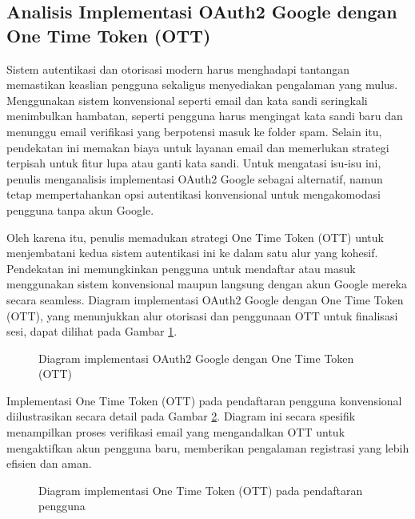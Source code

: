 \subsection{Analisis Implementasi OAuth2 Google dengan One Time Token (OTT)}

Sistem autentikasi dan otorisasi modern harus menghadapi tantangan memastikan keaslian pengguna sekaligus menyediakan pengalaman yang mulus. Menggunakan sistem konvensional seperti email dan kata sandi seringkali menimbulkan hambatan, seperti pengguna harus mengingat kata sandi baru dan menunggu email verifikasi yang berpotensi masuk ke folder spam. Selain itu, pendekatan ini memakan biaya untuk layanan email dan memerlukan strategi terpisah untuk fitur lupa atau ganti kata sandi. Untuk mengatasi isu-isu ini, penulis menganalisis implementasi OAuth2 Google sebagai alternatif, namun tetap mempertahankan opsi autentikasi konvensional untuk mengakomodasi pengguna tanpa akun Google.

Oleh karena itu, penulis memadukan strategi One Time Token (OTT) untuk menjembatani kedua sistem autentikasi ini ke dalam satu alur yang kohesif. Pendekatan ini memungkinkan pengguna untuk mendaftar atau masuk menggunakan sistem konvensional maupun langsung dengan akun Google mereka secara seamless. Diagram implementasi OAuth2 Google dengan One Time Token (OTT), yang menunjukkan alur otorisasi dan penggunaan OTT untuk finalisasi sesi, dapat dilihat pada Gambar \ref{fig:diagram_oauth_ott}.

\begin{figure}[H]
    \centering
    \caption{Diagram implementasi OAuth2 Google dengan One Time Token (OTT)}
    \label{fig:diagram_oauth_ott}
\end{figure}

Implementasi One Time Token (OTT) pada pendaftaran pengguna konvensional diilustrasikan secara detail pada Gambar \ref{fig:diagram_signup_ott}. Diagram ini secara spesifik menampilkan proses verifikasi email yang mengandalkan OTT untuk mengaktifkan akun pengguna baru, memberikan pengalaman registrasi yang lebih efisien dan aman.

\begin{figure}[H]
    \centering
    \caption{Diagram implementasi One Time Token (OTT) pada pendaftaran pengguna}
    \label{fig:diagram_signup_ott}
\end{figure}

